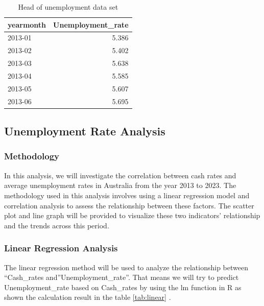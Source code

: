 \documentclass[11pt,a4paper,]{article}
\begin{document}
\begin{table}

\caption{\label{tab:tabun}Head of unemployment data set}
\centering
\begin{tabular}[t]{l|r}
\hline
yearmonth & Unemployment\_rate\\
\hline
2013-01 & 5.386\\
\hline
2013-02 & 5.402\\
\hline
2013-03 & 5.638\\
\hline
2013-04 & 5.585\\
\hline
2013-05 & 5.607\\
\hline
2013-06 & 5.695\\
\hline
\end{tabular}
\end{table}

\begin{quote}
\end{quote}

\hypertarget{unemployment-rate-analysis-1}{%
\subsection{Unemployment Rate Analysis}\label{unemployment-rate-analysis-1}}

\hypertarget{methodology}{%
\subsubsection{Methodology}\label{methodology}}

In this analysis, we will investigate the correlation between cash rates and average unemployment rates in Australia from the year 2013 to 2023. The methodology used in this analysis involves using a linear regression model and correlation analysis to assess the relationship between these factors. The scatter plot and line graph will be provided to visualize these two indicators' relationship and the trends across this period.

\hypertarget{linear-regression-analysis}{%
\subsubsection{Linear Regression Analysis}\label{linear-regression-analysis}}

The linear regression method will be used to analyze the relationship between ``Cash\_rates and''Unemployment\_rate''. That means we will try to predict Unemployment\_rate based on Cash\_rates by using the lm function in R as shown the calculation result in the table \ref{tab:linear} .
\end{document}
